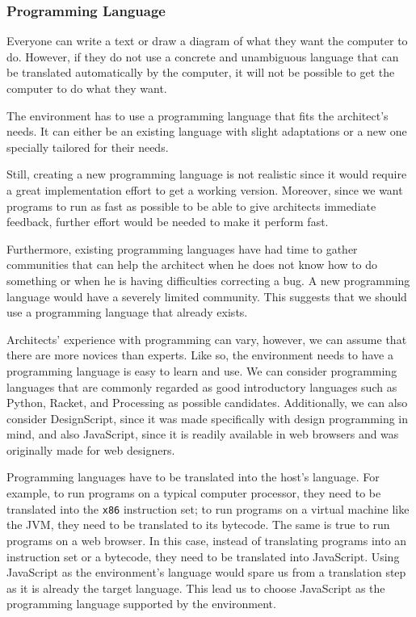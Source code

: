 \subsubsection{Programming Language}
Everyone can write a text or draw a diagram of what they want the computer to do.
However, if they do not use a concrete and unambiguous language that can be translated automatically by the computer, it will not be possible to get the computer to do what they want.

The environment has to use a programming language that fits the architect's needs.
It can either be an existing language with slight adaptations or a new one specially tailored for their needs.

Still, creating a new programming language is not realistic since it would require a great implementation effort to get a working version.
Moreover, since we want programs to run as fast as possible to be able to give architects immediate feedback, further effort would be needed to make it perform fast.

Furthermore, existing programming languages have had time to gather communities that can help the architect when he does not know how to do something or when he is having difficulties correcting a bug.
A new programming language would have a severely limited community.
This suggests that we should use a programming language that already exists.

Architects' experience with programming can vary, however, we can assume that there are more novices than experts.
Like so, the environment needs to have a programming language is easy to learn and use.
We can consider programming languages that are commonly regarded as good introductory languages such as Python, Racket, and Processing as possible candidates.
Additionally, we can also consider DesignScript, since it was made specifically with design programming in mind, and also JavaScript, since it is readily available in web browsers and was originally made for web designers.

Programming languages have to be translated into the host's language.
For example, to run programs on a typical computer processor, they need to be translated into the {\tt x86} instruction set; to run programs on a virtual machine like the JVM, they need to be translated to its bytecode.
The same is true to run programs on a web browser.
In this case, instead of translating programs into an instruction set or a bytecode, they need to be translated into JavaScript.
Using JavaScript as the environment's language would spare us from a translation step as it is already the target language.
This lead us to choose JavaScript as the programming language supported by the environment.

